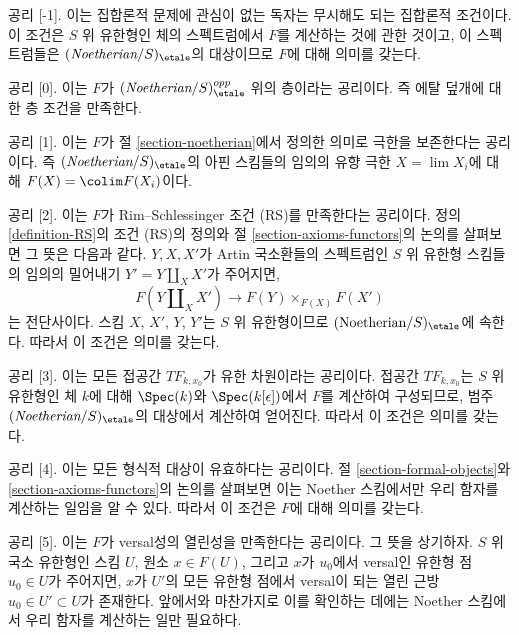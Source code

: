 \medskip\noindent
공리 [-1]. 이는 집합론적 문제에 관심이 없는 독자는 무시해도 되는
집합론적 조건이다. 이 조건은 $S$ 위 유한형인 체의 스펙트럼에서
$F$를 계산하는 것에 관한 것이고, 이 스펙트럼들은
$(\textit{Noetherian}/S)_\etale$의 대상이므로 $F$에 대해 의미를 갖는다.

\medskip\noindent
공리 [0]. 이는 $F$가
$(\textit{Noetherian}/S)_\etale^{opp}$ 위의 층이라는 공리이다.
즉 에탈 덮개에 대한 층 조건을 만족한다.

\medskip\noindent
공리 [1]. 이는 $F$가 절 \ref{section-noetherian}에서 정의한 의미로
극한을 보존한다는 공리이다. 즉 $(\textit{Noetherian}/S)_\etale$의
아핀 스킴들의 임의의 유향 극한 $X = \lim X_i$에 대해
$F(X) = \colim F(X_i)$이다.

\medskip\noindent
공리 [2]. 이는 $F$가 Rim--Schlessinger 조건 (RS)를 만족한다는 공리이다.
정의 \ref{definition-RS}의 조건 (RS)의 정의와
절 \ref{section-axioms-functors}의 논의를 살펴보면 그 뜻은 다음과 같다.
$Y, X, X'$가 Artin 국소환들의 스펙트럼인 $S$ 위 유한형 스킴들의
임의의 밀어내기 $Y' = Y \amalg_X X'$가 주어지면,
$$
F(Y \amalg_X X') \to F(Y) \times_{F(X)} F(X')
$$
는 전단사이다. 스킴 $X$, $X'$, $Y$, $Y'$는 $S$ 위 유한형이므로
$(\text{Noetherian}/S)_\etale$에 속한다. 따라서 이 조건은 의미를 갖는다.

\medskip\noindent
공리 [3]. 이는 모든 접공간 $TF_{k, x_0}$가 유한 차원이라는 공리이다.
접공간 $TF_{k, x_0}$는 $S$ 위 유한형인 체 $k$에 대해
$\Spec(k)$와 $\Spec(k[\epsilon])$에서 $F$를 계산하여 구성되므로,
범주 $(\textit{Noetherian}/S)_\etale$의 대상에서 계산하여 얻어진다.
따라서 이 조건은 의미를 갖는다.

\medskip\noindent
공리 [4]. 이는 모든 형식적 대상이 유효하다는 공리이다.
절 \ref{section-formal-objects}와 \ref{section-axioms-functors}의
논의를 살펴보면 이는 Noether 스킴에서만 우리 함자를 계산하는 일임을
알 수 있다. 따라서 이 조건은 $F$에 대해 의미를 갖는다.

\medskip\noindent
공리 [5]. 이는 $F$가 versal성의 열린성을 만족한다는 공리이다.
그 뜻을 상기하자. $S$ 위 국소 유한형인 스킴 $U$, 원소 $x \in F(U)$,
그리고 $x$가 $u_0$에서 versal인 유한형 점 $u_0 \in U$가 주어지면,
$x$가 $U'$의 모든 유한형 점에서 versal이 되는 열린 근방
$u_0 \in U' \subset U$가 존재한다.
앞에서와 마찬가지로 이를 확인하는 데에는 Noether 스킴에서 우리 함자를
계산하는 일만 필요하다.

